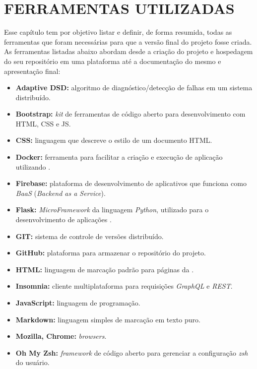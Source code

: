 
\chapter{FERRAMENTAS UTILIZADAS}
\label{chap:ferramentas_utilizadas}

Esse capítulo tem por objetivo listar e definir, de forma resumida, todas as ferramentas que foram necessárias para que a versão final do projeto fosse criada. As ferramentas listadas abaixo abordam desde a criação do projeto e hospedagem do seu repositório em uma plataforma \online{} até a documentação do mesmo e apresentação final:

\begin{itemize}
    \item \textbf{Adaptive DSD:} algoritmo de diagnóstico/detecção de falhas em um sistema distribuído. 
    \item \textbf{Bootstrap:} \textit{kit} de ferramentas de código aberto para desenvolvimento com HTML, CSS e JS.
    \item \textbf{CSS:} linguagem que descreve o estilo de um documento HTML.
    \item \textbf{Docker:} ferramenta para facilitar a criação e execução de aplicação utilizando \containers{}.
    \item \textbf{Firebase:} plataforma de desenvolvimento de aplicativos que funciona como \textit{BaaS} (\textit{Backend as a Service}).
    \item \textbf{Flask:} \textit{MicroFramework} da linguagem \textit{Python}, utilizado para o desenvolvimento de aplicações \web.
    \item \textbf{GIT:} sistema de controle de versões distribuído.
    \item \textbf{GitHub:} plataforma \online{} para armazenar o repositório do projeto.
    \item \textbf{HTML:} linguagem de marcação padrão para páginas da \web{}.
    \item \textbf{Insomnia:} cliente multiplataforma para requisições \textit{GraphQL} e \textit{REST}. 
    \item \textbf{JavaScript:} linguagem de programação.
    \item \textbf{Markdown:} linguagem simples de marcação em texto puro.
    \item \textbf{Mozilla, Chrome:} \textit{browsers}.
    \item \textbf{Oh My Zsh:} \textit{framework} de código aberto para gerenciar a configuração \textit{zsh} do usuário.

\end{itemize}
